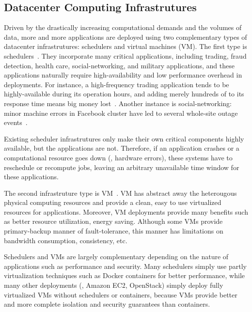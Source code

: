 \vspace{-.15in}\subsection{Datacenter Computing Infrastrutures}
\label{sec:datacenter}\vspace{-.075in}



Driven by the drastically increasing computational demands and the volumes of 
data, more and more applications are deployed using two complementary types of 
datacenter infrastrutures: 
schedulers and virtual machines 
(VM). The first type is 
schedulers~\cite{borg:eurosys15,mesos:nsdi11,tupperware, yarn:socc13,
autopilot:sosp07,quincy:sosp09,apollo:osdi14,fuxi:vldb14}. They incorporate 
many critical applications, including trading, 
fraud detection, health care, social-networking, and military applications, and 
these applications naturally require high-availability 
and low performance overhead in deployments. For instance, a high-frequency 
trading application tends to be highly-available during its operation hours, 
and adding merely hundreds of \us to its response time means big money 
lost~\cite{nosql:finance}. Another instance is social-networking: minor machine 
errors in Facebook cluster have led to several whole-site outage 
events~\cite{facebook:outage}.


Existing scheduler infrastrutures only make their own critical components 
highly available, but the applications are not. Therefore, if an application 
crashes or a computational resource goes down (\eg, hardware errors), these 
systems have to reschedule or recompute jobs, leaving an arbitrary unavailable 
time window for these applications.

% 
The second infrastruture type is VM~\cite{amazon:ec2, openstack, vmware}. VM 
has abstract away the heterougous physical computing resources and provide a 
clean, easy to use virtualized resources for applications. Moreover, VM 
deployments provide many benefits such as better resource utilization, energy 
saving. Although some VMs provide primary-backup manner of fault-tolerance, 
this manner has limitations on bandwidth consumption, consistency, etc.

Schedulers and VMs are largely complementary depending on the nature of 
applications such as performance and security. Many schedulers simply use 
partly virtualization techniques such as Docker containers for better 
performance, while many other deployments (\eg, Amazon EC2, OpenStack) simply 
deploy fully virtualized VMs without schedulers or containers, because VMs 
provide better and more complete isolation and security guarantees than 
containers.


